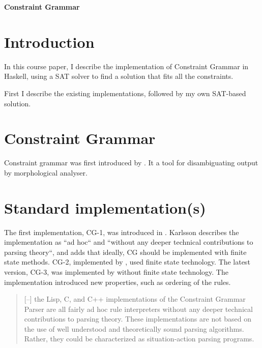 \documentclass[a4paper, 11pt]{article}
\begin{document}
\lstset{language=Haskell}
\pagestyle{fancy}
\lhead{\textcolor{gray}{Inari Listenmaa}}
\chead{\textcolor{gray}{\bf Grammar Formalisms}}
\rhead{\textcolor{gray}{LP2 2014}}
\lfoot{\textcolor{gray}{}}
\rfoot{\thepage}
\renewcommand{\headrulewidth}{0.5pt} 
\renewcommand{\footrulewidth}{0.5pt} 
\fancyfoot[C]{\footnotesize \textcolor{gray}{}} 

\centerline{ {\Large \bf Constraint Grammar} }
\vspace*{0.2cm}

\section{Introduction}

In this course paper, I describe the implementation of Constraint Grammar in Haskell, using a SAT solver to find a solution that fits all the constraints.

First I describe the existing implementations, followed by my own SAT-based solution.

\section{Constraint Grammar}

Constraint grammar was first introduced by \cite{KarlssonTODO}. 
It a tool for disambiguating output by morphological analyser.

\section{Standard implementation(s)}

The first implementation, CG-1, was introduced in \cite{KarlssonTODO}. Karlsson describes the implementation as ``ad hoc`` and ``without any deeper technical contributions to parsing theory``, and adds that ideally, CG should be implemented with finite state methods.
CG-2, implemented by \cite{tapanainen1996}, used finite state technology. 
The latest version, CG-3, was implemented by \cite{TODO} without finite state technology. The implementation introduced new properties, such as ordering of the rules.

\begin{quote}
[--] the Lisp, C, and C++ implementations of the Constraint Grammar Parser are all fairly ad hoc rule interpreters without any deeper technical contributions to parsing theory. These implementations are not based on the use of well understood and theoretically sound parsing algorithms. Rather, they could be characterized as situation-action parsing programs. 
\end{quote}
\end{document}

